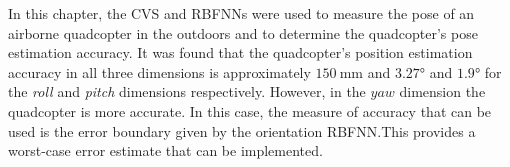 In this chapter, the CVS and RBFNNs were used to measure the pose of an airborne quadcopter in the outdoors and to determine the quadcopter's pose estimation accuracy. It was found that the quadcopter's position estimation accuracy in all three dimensions is approximately $\SI{150}{\mm}$ and $\ang{3.27}$ and $\ang{1.9}$ for the \emph{roll} and \emph{pitch} dimensions respectively. However, in the $yaw$ dimension the quadcopter is more accurate. In this case, the measure of accuracy that can be used is the error boundary given by the orientation RBFNN.\@ This provides a worst-case error estimate that can be implemented. 

